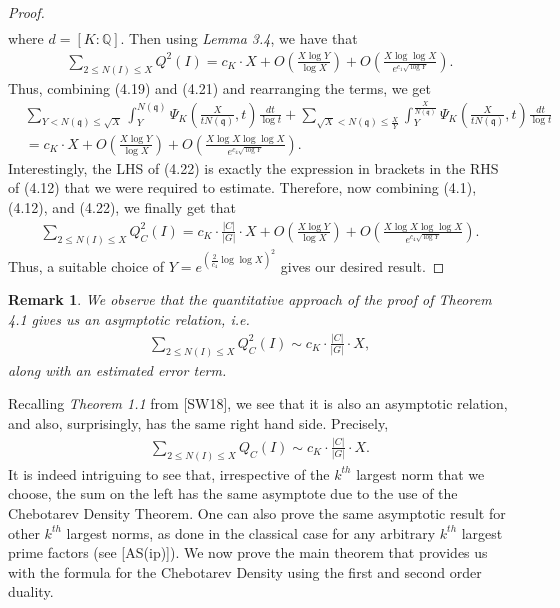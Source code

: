 \documentclass[12pt]{article}
\numberwithin{equation}{section}
\newtheorem{remark}[theorem]{Remark}
\numberwithin{equation}{section}
\begin{document}
\begin{proof}
\begin{align}
\end{align}
where $d = [K:\mathbb{Q}]$. Then using \textit{Lemma 3.4}, we have that
\begin{align}
     \sum_{2\leq N(I)\leq X} Q^2(I) =
c_K\cdot X +O\left(\frac{X\log Y}{\log X}\right)+O\left(\frac{X\log\log X}{e^{c_1\sqrt{\log Y}}}\right) .
\end{align}
Thus, combining (4.19) and (4.21) and rearranging the terms, we get
\begin{align}
    &\sum_{Y<N(\mathfrak{q})\leq \sqrt{X}}\int_Y^{N(\mathfrak{q})} \Psi_K\left(\frac{X}{tN(\mathfrak{q})},t\right)\frac{dt}{\log t} +
\sum_{\sqrt{X}<N(\mathfrak{q})\leq \frac{X}{Y}}\int_Y^{\frac{X}{N(\mathfrak{q})}} \Psi_K\left(\frac{X}{tN(\mathfrak{q})},t\right)\frac{dt}{\log t} \nonumber \\ 
&= c_K\cdot X +O\left(\frac{X\log Y}{\log X}\right)+O\left(\frac{X\log X\log\log X}{e^{c_4\sqrt{\log Y}}}\right).
\end{align}
Interestingly, the LHS of (4.22) is exactly the expression in brackets in the RHS of (4.12) that we were required to estimate. Therefore, now combining (4.1), (4.12), and (4.22), we finally get that
\begin{align}
     \sum_{2\leq N(I)\leq X} Q_C^2(I) = c_K\cdot \frac{|C|}{|G|}\cdot X  +O\left(\frac{X\log Y}{\log X}\right)+O\left(\frac{X\log X\log\log X}{e^{c_4\sqrt{\log Y}}}\right).
\end{align}
  Thus, a suitable choice of $Y = e^{\left(\frac{2}{c_4}\log\log X\right)^2}$ gives our desired result.
    \end{proof}
 \begin{remark}
     We observe that the quantitative approach of the proof of \textit{Theorem 4.1} gives us an asymptotic relation, i.e.
     \begin{align}
         \sum_{2\leq N(I)\leq X} Q_C^2(I) \sim c_K\cdot \frac{|C|}{|G|}\cdot X,
     \end{align}
     along with an estimated error term.
 \end{remark}
\noindent 
\noindent Recalling \textit{Theorem 1.1} from [SW18], we see that it is also an asymptotic relation, and also, surprisingly, has the same right hand side. Precisely,
\begin{align}
    \sum_{2\leq N(I)\leq X} Q_C(I) \sim c_K\cdot \frac{|C|}{|G|}\cdot X.
\end{align}
 It is indeed intriguing to see that, irrespective of the $k^{th}$ largest norm that we choose, the sum on the left has the same asymptote due to the use of the Chebotarev Density Theorem. One can also prove the same asymptotic result for other $k^{th}$ largest norms, as done in the classical case for any arbitrary $k^{th}$ largest prime factors (see [AS(ip)]). We now prove the main theorem that provides us with the formula for the Chebotarev Density using the first and second order duality.  
\end{document}
